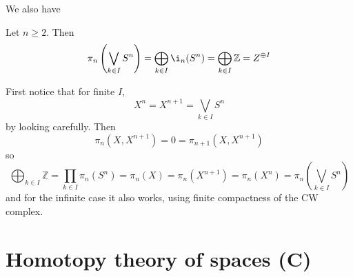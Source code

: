 We also have
\begin{proposition}
	Let $n\geq 2$. Then 
	$$\pi_n\left(\bigvee_{k\in I}S^n\right)=\bigoplus_{k\in I}\i_n(S^n)=\bigoplus_{k\in I}\mathbb{Z}=Z^{\oplus I}$$
\end{proposition}
\begin{proposition}
	First notice that for finite $I$,
	$$X^n=X^{n+1}=\bigvee_{k\in I}S^n$$
	by looking carefully. Then
	$$\pi_n(X,X^{n+1})=0=\pi_{n+1}(X,X^{n+1})$$
	so
	$$\bigoplus_{k\in I}\mathbb{Z}=\prod_{k\in I}\pi_n(S^n)=\pi_n(X)=\pi_n(X^{n+1})=\pi_n(X^n)=\pi_n\left(\bigvee_{k\in I}S^n\right)$$
	and for the infinite case it also works, using finite compactness of the CW complex.
\end{proposition}

\section{Homotopy theory of spaces (C)}

